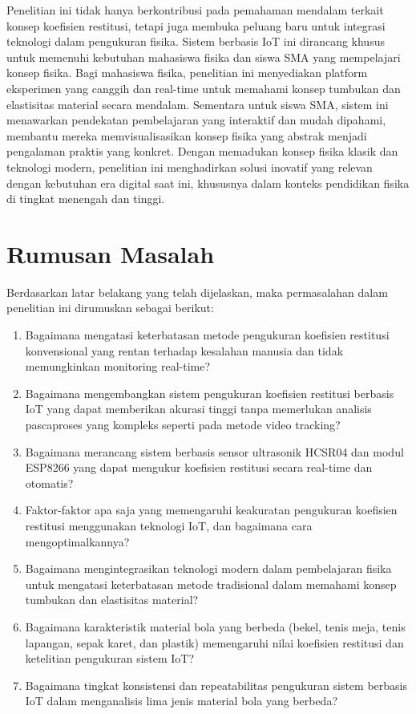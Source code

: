 Penelitian ini tidak hanya berkontribusi pada pemahaman mendalam terkait konsep koefisien restitusi, tetapi juga membuka peluang baru untuk integrasi teknologi dalam pengukuran fisika. Sistem berbasis IoT ini dirancang khusus untuk memenuhi kebutuhan mahasiswa fisika dan siswa SMA yang mempelajari konsep fisika. Bagi mahasiswa fisika, penelitian ini menyediakan platform eksperimen yang canggih dan real-time untuk memahami konsep tumbukan dan elastisitas material secara mendalam. Sementara untuk siswa SMA, sistem ini menawarkan pendekatan pembelajaran yang interaktif dan mudah dipahami, membantu mereka memvisualisasikan konsep fisika yang abstrak menjadi pengalaman praktis yang konkret. Dengan memadukan konsep fisika klasik dan teknologi modern, penelitian ini menghadirkan solusi inovatif yang relevan dengan kebutuhan era digital saat ini, khususnya dalam konteks pendidikan fisika di tingkat menengah dan tinggi.

\section{Rumusan Masalah}
 Berdasarkan latar belakang yang telah dijelaskan, maka permasalahan dalam penelitian ini dirumuskan sebagai berikut:
\begin{enumerate}
\item Bagaimana mengatasi keterbatasan metode pengukuran koefisien restitusi konvensional yang rentan terhadap kesalahan manusia dan tidak memungkinkan monitoring real-time?
\item Bagaimana mengembangkan sistem pengukuran koefisien restitusi berbasis IoT yang dapat memberikan akurasi tinggi tanpa memerlukan analisis pascaproses yang kompleks seperti pada metode video tracking?
\item Bagaimana merancang sistem berbasis sensor ultrasonik HCSR04 dan modul ESP8266 yang dapat mengukur koefisien restitusi secara real-time dan otomatis?
\item Faktor-faktor apa saja yang memengaruhi keakuratan pengukuran koefisien restitusi menggunakan teknologi IoT, dan bagaimana cara mengoptimalkannya?
\item Bagaimana mengintegrasikan teknologi modern dalam pembelajaran fisika untuk mengatasi keterbatasan metode tradisional dalam memahami konsep tumbukan dan elastisitas material?
\item Bagaimana karakteristik material bola yang berbeda (bekel, tenis meja, tenis lapangan, sepak karet, dan plastik) memengaruhi nilai koefisien restitusi dan ketelitian pengukuran sistem IoT?
\item Bagaimana tingkat konsistensi dan repeatabilitas pengukuran sistem berbasis IoT dalam menganalisis lima jenis material bola yang berbeda?
\end{enumerate}

